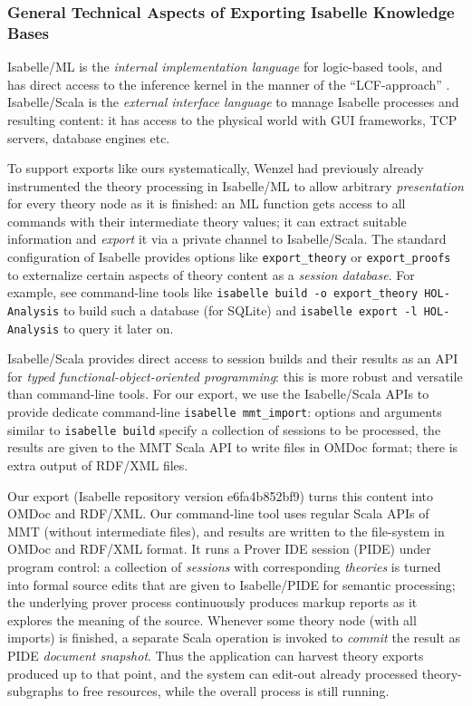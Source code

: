 \subsubsection{General Technical Aspects of Exporting Isabelle Knowledge Bases}

Isabelle/ML is the \emph{internal implementation language} for logic-based tools, and has direct access to the inference kernel in the manner of the ``LCF-approach'' \cite{Gordon-Milner-Wadsworth:1979}.
Isabelle/Scala is the \emph{external interface language} to manage Isabelle processes and
resulting content: it has access to the physical world with GUI frameworks, TCP servers, database engines etc.

To support exports like ours systematically, Wenzel had previously already instrumented the theory processing in Isabelle/ML to allow arbitrary \emph{presentation} for every theory node as it is finished: an ML function gets access to all commands with their intermediate theory
values; it can extract suitable information and \emph{export} it via a private channel to Isabelle/Scala.
The standard configuration of Isabelle provides options like \verb,export_theory, or \verb,export_proofs, to externalize certain aspects of theory content as a \emph{session database}.
For example, see command-line tools like \verb,isabelle build -o export_theory HOL-Analysis, to build such a database (for SQLite) and \verb,isabelle export -l HOL-Analysis, to query it later on.

Isabelle/Scala provides direct access to session builds and their results as an API for \emph{typed functional-object-oriented programming}: this is more robust and versatile than command-line tools.
For our export, we use the Isabelle/Scala APIs to provide dedicate command-line \verb,isabelle mmt_import,: options and arguments similar to \verb,isabelle build, specify a collection of sessions to be processed, the results are given to the MMT Scala API to write files in OMDoc format; there is extra output of RDF/XML files.

Our export (Isabelle repository version e6fa4b852bf9) turns this content into OMDoc and RDF/XML.
Our command-line tool uses regular Scala APIs of MMT (without intermediate files), and results are written to the file-system in OMDoc and RDF/XML format.
It runs a Prover IDE session (PIDE) under program control: a collection of \emph{sessions} with corresponding \emph{theories} is turned into formal source edits that are given to Isabelle/PIDE for semantic processing; the underlying prover process continuously produces markup reports as it explores the meaning of the source.
Whenever some theory node (with all imports) is finished, a separate Scala operation is invoked to \emph{commit} the result as
PIDE \emph{document snapshot}.
Thus the application can harvest theory exports produced up to that point, and the system can edit-out already processed theory-subgraphs to free resources, while the overall process is still running.

